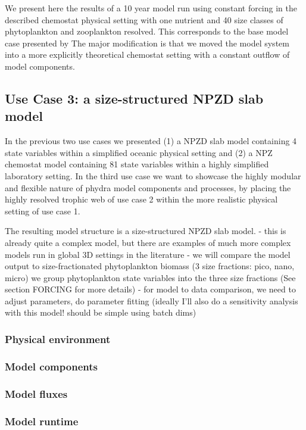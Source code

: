 \documentclass[template.tex]{subfiles}
\begin{document}
We present here the results of a 10 year model run using constant forcing in the described chemostat physical setting with one nutrient and 40 size classes of phytoplankton and zooplankton resolved. This corresponds to the base model case presented by \cite{Banas2011b} The major modification is that we moved the model system into a more explicitly theoretical chemostat setting with a constant outflow of model components. 


\subsection{Use Case 3: a size-structured NPZD slab model}

In the previous two use cases we presented (1) a NPZD slab model containing 4 state variables within a simplified oceanic physical setting and (2) a NPZ chemostat model containing 81 state variables within a highly simplified laboratory setting. 
In the third use case we want to showcase the highly modular and flexible nature of phydra model components and processes, by placing the highly resolved trophic web of use case 2 within the more realistic physical setting of use case 1.

The resulting model structure is a size-structured NPZD slab model.
- this is already quite a complex model, but there are examples of much more complex models run in global 3D settings in the literature \citep{Ward2012}
- we will compare the model output to size-fractionated phytoplankton biomass (3 size fractions: pico, nano, micro) we group phytoplankton state variables into the three size fractions (See section FORCING for more details)
- for model to data comparison, we need to adjust parameters, do parameter fitting (ideally I'll also do a sensitivity analysis with this model! should be simple using batch dims)

\subsubsection{Physical environment}
\subsubsection{Model components}

\subsubsection{Model fluxes}

\subsubsection{Model runtime}
\end{document}
